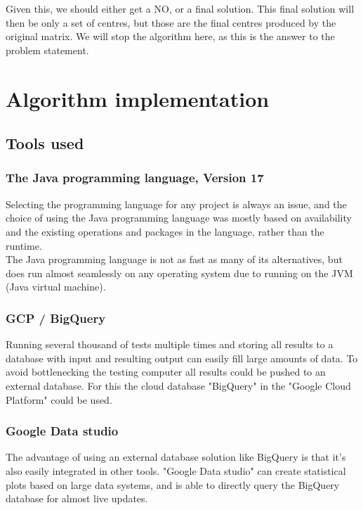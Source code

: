 \documentclass[a4paper]{article}
\begin{document}
%

Given this, we should either get a NO, or a final solution. This final solution will then be only a set of centres,
but those are the final centres produced by the original matrix. We will stop the algorithm here, as this is the answer to
the problem statement.

%
%
\newpage

\section{Algorithm implementation}
\subsection{Tools used}
\subsubsection{The Java programming language, Version 17}
Selecting the programming language for any project is always an issue, and the choice of using
the Java programming language was mostly based on availability and the existing operations
and packages in the language, rather than the runtime.
\\
The Java programming language is not as fast as many of its alternatives, but does run almost
seamlessly on any operating system due to running on the JVM (Java virtual machine).

\subsubsection{GCP / BigQuery}
\label{sec:bigquery}
Running several thousand of tests multiple times and storing all results to a database with
input and resulting output can easily fill large amounts of data. To avoid bottlenecking the
testing computer all results could be pushed to an external database. For this the cloud database
"BigQuery" in the "Google Cloud Platform" could be used.

\subsubsection{Google Data studio}
\label{sec:datastudio}
The advantage of using an external database solution like BigQuery is that it's also easily
integrated in other tools. "Google Data studio" can create statistical plots based on large
data systems, and is able to directly query the BigQuery database for almost live updates.
\end{document}
